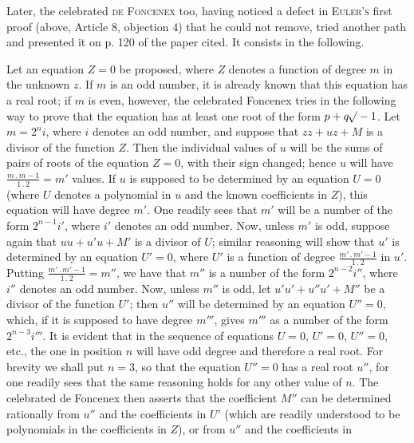 Later, the celebrated \textsc{de Foncenex} too, having noticed a defect in \textsc{Euler's} first proof (above, Article 8, objection 4) that he could not remove, tried another path and presented it on p. 120 of the paper cited. It consists in the following.

Let an equation $Z=0$ be proposed, where $Z$ denotes a function of degree $m$ in the unknown $z$. If $m$ is an odd number, it is already known that this equation has a real root; if $m$ is even, however, the celebrated Foncenex tries in the following way to prove that the equation has at least one root of the form $p+q\mathord{{}^{}\!\surd}-1$. Let $m=2^n i$, where $i$ denotes an odd number, and suppose that $zz+uz+M$ is a divisor of the function $Z$. Then the individual values of $u$ will be the sums of pairs of roots of the equation $Z=0$, with their sign changed; hence $u$ will have $\frac{m\mathbin{.}m-1}{1\mathbin{.}2}=m'$ values. If $u$ is supposed to be determined by an equation $U=0$ (where $U$ denotes a polynomial in $u$ and the known coefficients in $Z$), this equation will have degree $m'$. One readily sees that $m'$ will be a number of the form $2^{n-1}i'$, where $i'$ denotes an odd number. Now, unless $m'$ is odd, suppose again that $uu+u'u+M'$ is a divisor of $U$; similar reasoning will show that $u'$ is determined by an equation $U'=0$, where $U'$ is a function of degree $\frac{m'\mathbin{.}m'-1}{1\mathbin{.}2}$ in $u'$. Putting $\frac{m'\mathbin{.}m'-1}{1\mathbin{.}2}=m''$, we have that $m''$ is a number of the form $2^{n-2}i''$, where $i''$ denotes an odd number. Now, unless $m''$ is odd, let $u'u'+u''u'+M''$ be a divisor of the function $U'$; then $u''$ will be determined by an equation $U''=0$, which, if it is supposed to have degree $m'''$, gives $m'''$ as a number of the form $2^{n-3}i'''$. It is evident that in the sequence of equations $U=0$, $U'=0$, $U''=0$, etc., the one in position $n$ will have odd degree and therefore a real root. For brevity we shall put $n=3$, so that the equation $U''=0$ has a real root $u''$, for one readily sees that the same reasoning holds for any other value of $n$. The celebrated de Foncenex then asserts that the coefficient $M''$ can be determined rationally from $u''$ and the coefficients in $U'$ (which are readily understood to be polynomials in the coefficients in $Z$), or from $u''$ and the coefficients in
